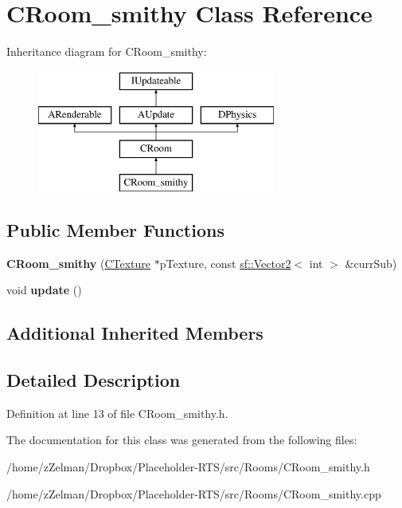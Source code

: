 \hypertarget{classCRoom__smithy}{\section{C\-Room\-\_\-smithy Class Reference}
\label{classCRoom__smithy}
}
Inheritance diagram for C\-Room\-\_\-smithy\-:\begin{figure}[H]
\begin{center}
\leavevmode
\includegraphics[height=4.000000cm]{classCRoom__smithy}
\end{center}
\end{figure}
\subsection*{Public Member Functions}
\begin{DoxyCompactItemize}
\item 
\hypertarget{classCRoom__smithy_abb70a37327425c0b7f83f3e7c8ef5a9b}{{\bfseries C\-Room\-\_\-smithy} (\hyperlink{classCTexture}{C\-Texture} $\ast$p\-Texture, const \hyperlink{classsf_1_1Vector2}{sf\-::\-Vector2}$<$ int $>$ \&curr\-Sub)}\label{classCRoom__smithy_abb70a37327425c0b7f83f3e7c8ef5a9b}

\item 
\hypertarget{classCRoom__smithy_a5e7be1eed9a469748fcd6ed7ecd3c772}{void {\bfseries update} ()}\label{classCRoom__smithy_a5e7be1eed9a469748fcd6ed7ecd3c772}

\end{DoxyCompactItemize}
\subsection*{Additional Inherited Members}


\subsection{Detailed Description}


Definition at line 13 of file C\-Room\-\_\-smithy.\-h.



The documentation for this class was generated from the following files\-:\begin{DoxyCompactItemize}
\item 
/home/z\-Zelman/\-Dropbox/\-Placeholder-\/\-R\-T\-S/src/\-Rooms/C\-Room\-\_\-smithy.\-h\item 
/home/z\-Zelman/\-Dropbox/\-Placeholder-\/\-R\-T\-S/src/\-Rooms/C\-Room\-\_\-smithy.\-cpp\end{DoxyCompactItemize}
